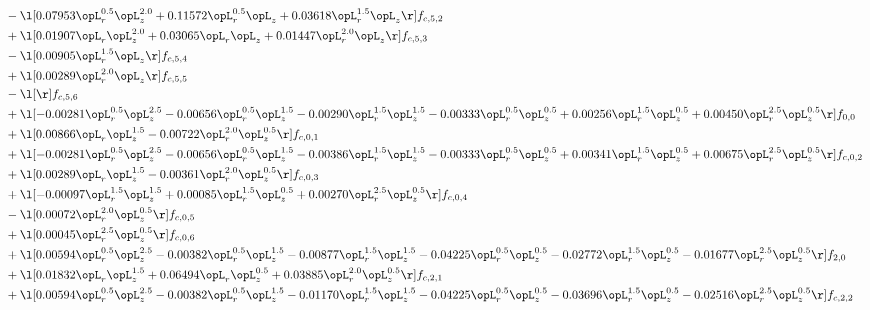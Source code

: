 \begin{alignat}{2}
& - \l[  0.07953 \opL_r^{0.5} \opL_z^{2.0} +  0.11572 \opL_r^{0.5} \opL_z +  0.03618 \opL_r^{1.5} \opL_z  \r] f_{c,5,2} \nonumber \\ 
& + \l[  0.01907 \opL_r \opL_z^{2.0} +  0.03065 \opL_r \opL_z +  0.01447 \opL_r^{2.0} \opL_z  \r] f_{c,5,3} \nonumber \\ 
& - \l[  0.00905 \opL_r^{1.5} \opL_z  \r] f_{c,5,4} \nonumber \\ 
& + \l[  0.00289 \opL_r^{2.0} \opL_z  \r] f_{c,5,5} \nonumber \\ 
& - \l[  \r] f_{c,5,6} \nonumber \\ 
& + \l[  -0.00281 \opL_r^{0.5} \opL_z^{2.5}   -0.00656 \opL_r^{0.5} \opL_z^{1.5}   -0.00290 \opL_r^{1.5} \opL_z^{1.5}   -0.00333 \opL_r^{0.5} \opL_z^{0.5} +  0.00256 \opL_r^{1.5} \opL_z^{0.5} +  0.00450 \opL_r^{2.5} \opL_z^{0.5}  \r] f_{0,0} \nonumber \\ 
& + \l[  0.00866 \opL_r \opL_z^{1.5}   -0.00722 \opL_r^{2.0} \opL_z^{0.5}  \r] f_{c,0,1} \nonumber \\ 
& + \l[  -0.00281 \opL_r^{0.5} \opL_z^{2.5}   -0.00656 \opL_r^{0.5} \opL_z^{1.5}   -0.00386 \opL_r^{1.5} \opL_z^{1.5}   -0.00333 \opL_r^{0.5} \opL_z^{0.5} +  0.00341 \opL_r^{1.5} \opL_z^{0.5} +  0.00675 \opL_r^{2.5} \opL_z^{0.5}  \r] f_{c,0,2} \nonumber \\ 
& + \l[  0.00289 \opL_r \opL_z^{1.5}   -0.00361 \opL_r^{2.0} \opL_z^{0.5}  \r] f_{c,0,3} \nonumber \\ 
& + \l[  -0.00097 \opL_r^{1.5} \opL_z^{1.5} +  0.00085 \opL_r^{1.5} \opL_z^{0.5} +  0.00270 \opL_r^{2.5} \opL_z^{0.5}  \r] f_{c,0,4} \nonumber \\ 
& - \l[  0.00072 \opL_r^{2.0} \opL_z^{0.5}  \r] f_{c,0,5} \nonumber \\ 
& + \l[  0.00045 \opL_r^{2.5} \opL_z^{0.5}  \r] f_{c,0,6} \nonumber \\ 
& + \l[  0.00594 \opL_r^{0.5} \opL_z^{2.5}   -0.00382 \opL_r^{0.5} \opL_z^{1.5}   -0.00877 \opL_r^{1.5} \opL_z^{1.5}   -0.04225 \opL_r^{0.5} \opL_z^{0.5}   -0.02772 \opL_r^{1.5} \opL_z^{0.5}   -0.01677 \opL_r^{2.5} \opL_z^{0.5}  \r] f_{2,0} \nonumber \\ 
& + \l[  0.01832 \opL_r \opL_z^{1.5} +  0.06494 \opL_r \opL_z^{0.5} +  0.03885 \opL_r^{2.0} \opL_z^{0.5}  \r] f_{c,2,1} \nonumber \\ 
& + \l[  0.00594 \opL_r^{0.5} \opL_z^{2.5}   -0.00382 \opL_r^{0.5} \opL_z^{1.5}   -0.01170 \opL_r^{1.5} \opL_z^{1.5}   -0.04225 \opL_r^{0.5} \opL_z^{0.5}   -0.03696 \opL_r^{1.5} \opL_z^{0.5}   -0.02516 \opL_r^{2.5} \opL_z^{0.5}  \r] f_{c,2,2} \nonumber \\ 

\end{alignat}
